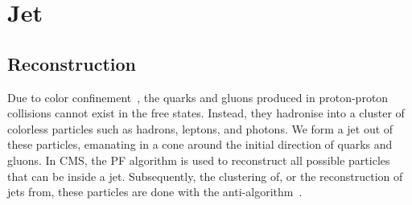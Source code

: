 \section{Jet}
\label{s:jet_reco}
\subsection{Reconstruction}
Due to color confinement~\cite{Polyakov:1976fu}, the quarks and gluons produced in proton-proton 
collisions cannot exist in the free states. Instead, they hadronise into a cluster of colorless particles 
such as hadrons, leptons, and photons. We form a jet out of these particles, emanating in a cone 
around the initial direction of quarks and gluons. In CMS, the PF algorithm is used to reconstruct all 
possible particles that can be inside a jet. Subsequently, the clustering of, or the reconstruction 
of jets from, these particles are done with the anti-\kt algorithm~\cite{Cacciari:2008gp}. 

